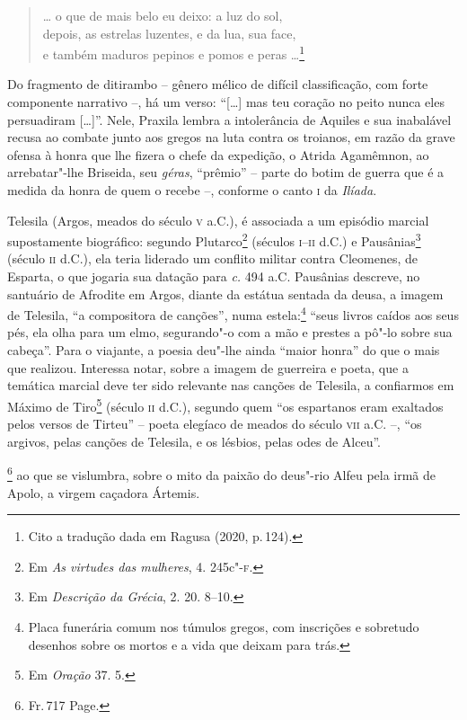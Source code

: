 \begin{verse}
\small{\ldots{} o que de mais belo eu deixo: a luz do sol,\\
 depois, as estrelas luzentes, e da lua, sua face,\\
e também maduros pepinos e pomos e peras \ldots{}}\footnote{Cito a tradução dada em Ragusa (2020, p.\,124).}
\end{verse}

Do fragmento de ditirambo -- gênero mélico de difícil classificação, com forte
componente narrativo --, há um verso: ``{[}\ldots{}{]} mas teu coração no peito nunca
eles persuadiram {[}\ldots{}{]}”. Nele, Praxila lembra a intolerância de Aquiles e sua
inabalável recusa ao combate junto aos gregos na luta contra os troianos, em razão da
grave ofensa à honra que lhe fizera o chefe da expedição, o Atrida
Agamêmnon, ao arrebatar"-lhe Briseida, seu \textit{géras}, “prêmio” -- parte do
botim de guerra que é a medida da honra de quem o recebe --, conforme o canto \textsc{i}
da \textit{Ilíada}.

Telesila (Argos, meados do século \textsc{v} a.C.), é associada a um episódio marcial
supostamente biográfico: segundo Plutarco\footnote{Em \textit{As
virtudes das mulheres}, 4. 245c"-\textsc{f}.} (séculos \textsc{i}--\textsc{ii} d.C.) e Pausânias\footnote{Em 
\textit{Descrição da Grécia}, 2. 20. 8--10.} (século \textsc{ii} d.C.), ela teria liderado um conflito
militar contra Cleomenes, de Esparta, o que jogaria sua datação para \textit{c.}
494 a.C. Pausânias descreve, no santuário de Afrodite em Argos, diante da
estátua sentada da deusa, a imagem de Telesila, ``a compositora de
canções”, numa estela:\footnote{ Placa funerária comum nos túmulos gregos, com
inscrições e sobretudo desenhos sobre os mortos e a vida que deixam para trás.} ``seus livros caídos aos seus
pés, ela olha para um elmo, segurando"-o com a mão e prestes a pô"-lo sobre sua
cabeça”. Para o viajante, a poesia deu"-lhe ainda ``maior honra” do
que o mais que realizou. Interessa notar, sobre a imagem de guerreira e poeta,
que a temática marcial deve ter sido relevante nas canções de Telesila, a
confiarmos em Máximo de Tiro\footnote{Em \textit{Oração} 37. 5.} (século \textsc{ii} d.C.), segundo
quem ``os espartanos eram exaltados pelos versos de Tirteu” -- 
poeta elegíaco de meados do século \textsc{vii} a.C. --, ``os argivos, pelas
canções de Telesila, e os lésbios, pelas odes de Alceu”. 

\footnote{Fr.\,717 Page.} 
ao que se vislumbra, sobre o mito da paixão do deus"-rio Alfeu pela irmã de Apolo,
a virgem caçadora Ártemis.

